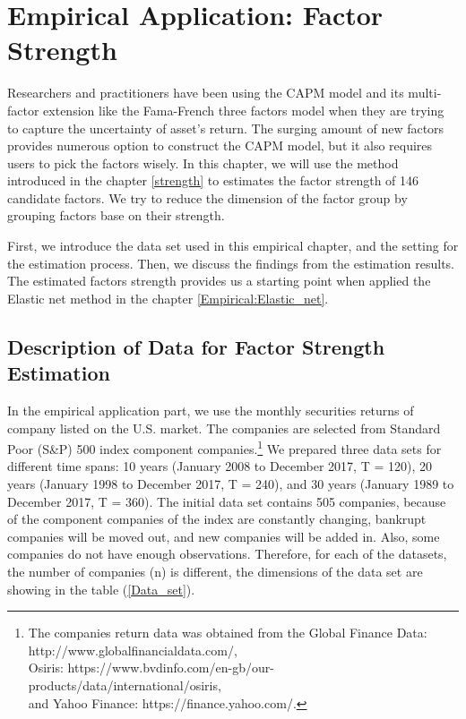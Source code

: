\chapter{Empirical Application: Factor Strength}\label{Empirical:factor_strength}
	
Researchers and practitioners have been using the CAPM model \cite{Sharpe1964, Lintner1965, Black1972} and its multi-factor extension like the Fama-French three factors model \cite{Fama1992} when they are trying to capture the uncertainty of asset's return.
The surging amount of new factors \cite{Harvey2019} provides numerous option to construct the CAPM model, but it also requires users to pick the factors wisely.
In this chapter, we will use the method introduced in the chapter \ref{strength} to estimates the factor strength of 146 candidate factors.
We try to reduce the dimension of the factor group by grouping factors base on their strength.

First, we introduce the data set used in this empirical chapter, and the setting for the estimation process.
Then, we discuss the findings from the estimation results.
The estimated factors strength provides us a starting point when applied the Elastic net method in the chapter \ref{Empirical:Elastic_net}.

	\section{Description of Data for Factor Strength Estimation}\label{data}
	

In the empirical application part, we use the monthly securities returns of company listed on the U.S. market.
The companies are selected from Standard Poor (S\&P) 500 index component companies.\footnote{The companies return data was obtained from the Global Finance Data: http://www.globalfinancialdata.com/,\\ Osiris: https://www.bvdinfo.com/en-gb/our-products/data/international/osiris, \\and Yahoo Finance: https://finance.yahoo.com/.}
We prepared three data sets for different time spans: 10 years (January 2008 to December 2017, T = 120), 20 years (January 1998 to December 2017, T  = 240), and 30 years (January 1989 to December 2017, T = 360).
The initial data set contains 505 companies, because of the component companies of the index are constantly changing, bankrupt companies will be moved out, and new companies will be added in.
Also, some companies do not have enough observations.
Therefore, for each of the datasets, the number of companies (n) is different, the dimensions of the data set are showing in the table (\ref{Data_set}).

